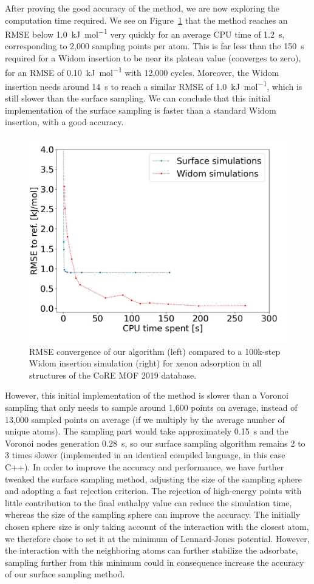 \documentclass[main]{subfiles}
\begin{document}
After proving the good accuracy of the method, we are now exploring the computation time required. We see on Figure~\ref{fgr:convergence} that the method reaches an RMSE below \SI{1.0}{\kilo\joule\per\mole} very quickly for an average CPU time of \SI{1.2}{\second}, corresponding to 2,000 sampling points per atom. This is far less than the \SI{150}{\second} required for a Widom insertion to be near its plateau value (converges to zero), for an RMSE of \SI{0.10}{\kilo\joule\per\mole} with 12,000 cycles. Moreover, the Widom insertion needs around \SI{14}{\second} to reach a similar RMSE of \SI{1.0}{\kilo\joule\per\mole}, which is still slower than the surface sampling. We can conclude that this initial implementation of the surface sampling is faster than a standard Widom insertion, with a good accuracy.

\begin{figure}[ht]
  \centering
    \includegraphics[width=0.7\linewidth]{figures/3-fastsim/time_rmse.jpeg}
    \caption{RMSE convergence of our algorithm (left) compared to a 100k-step Widom insertion simulation (right) for xenon adsorption in {all} structures of the CoRE MOF 2019 database.}\label{fgr:convergence}
  \end{figure}
  

However, this initial implementation of the method is slower than a Voronoi sampling that only needs to sample around 1,600 points on average, instead of 13,000 sampled points on average (if we multiply by the average number of unique atoms). The sampling part would take approximately \SI{0.15}{\second} and the Voronoi nodes generation \SI{0.28}{\second}, so our surface sampling algorithm remains 2 to 3 times slower (implemented in an identical compiled language, in this case C++). In order to improve the accuracy and performance, we have further tweaked the surface sampling method, adjusting the size of the sampling sphere and adopting a fast rejection criterion. The rejection of high-energy points with little contribution to the final enthalpy value can reduce the simulation time, whereas the size of the sampling sphere can improve the accuracy. The initially chosen sphere size is only taking account of the interaction with the closest atom, we therefore chose to set it at the minimum of Lennard-Jones potential. However, the interaction with the neighboring atoms can further stabilize the adsorbate, sampling further from this minimum could in consequence increase the accuracy of our surface sampling method.
\end{document}
